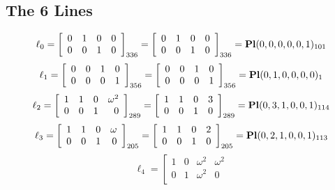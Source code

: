 \documentclass{article}
\begin{document}
{\subsection*{The 6 Lines}
$$
\ell_{0} = 
\left[
\begin{array}{*{4}{r}}
0 & 1 & 0 & 0\\
0 & 0 & 1 & 0\\
\end{array}
\right]
_{336}
=
\left[
\begin{array}{*{4}c}
0  & 1  & 0  & 0\\
0  & 0  & 1  & 0\\
\end{array}
\right]_{336}
={\rm\bf Pl}(0,0,0,0,0,1 )_{101}$$
$$
\ell_{1} = 
\left[
\begin{array}{*{4}{r}}
0 & 0 & 1 & 0\\
0 & 0 & 0 & 1\\
\end{array}
\right]
_{356}
=
\left[
\begin{array}{*{4}c}
0  & 0  & 1  & 0\\
0  & 0  & 0  & 1\\
\end{array}
\right]_{356}
={\rm\bf Pl}(0,1,0,0,0,0 )_{1}$$
$$
\ell_{2} = 
\left[
\begin{array}{*{4}{r}}
1 & 1 & 0 & \omega^{2}\\
0 & 0 & 1 & 0\\
\end{array}
\right]
_{289}
=
\left[
\begin{array}{*{4}c}
1  & 1  & 0  & 3\\
0  & 0  & 1  & 0\\
\end{array}
\right]_{289}
={\rm\bf Pl}(0,3,1,0,0,1 )_{114}$$
$$
\ell_{3} = 
\left[
\begin{array}{*{4}{r}}
1 & 1 & 0 & \omega \\
0 & 0 & 1 & 0\\
\end{array}
\right]
_{205}
=
\left[
\begin{array}{*{4}c}
1  & 1  & 0  & 2\\
0  & 0  & 1  & 0\\
\end{array}
\right]_{205}
={\rm\bf Pl}(0,2,1,0,0,1 )_{113}$$
$$
\ell_{4} = 
\left[
\begin{array}{*{4}{r}}
1 & 0 & \omega^{2} & \omega^{2}\\
0 & 1 & \omega^{2} & 0\\

\end{array}$$}
\end{document}
